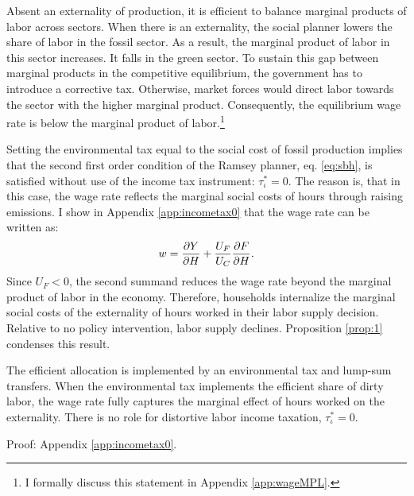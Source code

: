 Absent an externality of production, it is efficient to balance marginal products of labor across sectors.
When there is an externality, the social planner lowers the share of labor in the fossil sector. As a result, the marginal product of labor in this sector increases. It falls in the green sector. To sustain this gap between marginal products in the competitive equilibrium, the government has to introduce a corrective tax. Otherwise, market forces would direct labor towards the sector with the higher marginal product. Consequently, the equilibrium wage rate is below the marginal product of labor.\footnote{ I formally discuss this statement in Appendix \ref{app:wageMPL}.} 

Setting the environmental tax equal to the social cost of fossil production implies that the second first order condition of the Ramsey planner, eq. \eqref{eq:sbh}, is satisfied without use of the income tax instrument: $\tau_{\iota}^*=0$. 
The reason is, that in this case, the wage rate reflects the marginal social costs of hours through raising emissions. I show in Appendix \ref{app:incometax0} that the wage rate can be written as:
\begin{align*}
w = \frac{\partial{Y}}{\partial{H}}+\frac{U_F}{U_C}\frac{\partial{F}}{\partial{H}}.
\end{align*}
Since $U_F<0$, the second summand reduces the wage rate beyond the marginal product of labor in the economy.
Therefore, households internalize the marginal social costs of the externality of hours worked in their labor supply decision. Relative to no policy intervention, labor supply declines. Proposition \ref{prop:1} condenses this result.

\begin{prop}\label{prop:1}
	The efficient allocation is implemented by an environmental tax and lump-sum transfers.  When the environmental tax implements the efficient share of dirty labor, the wage rate fully captures the marginal effect of hours worked on the externality. There is no role for distortive labor income taxation, $\tau_{\iota}^*=0$.
\end{prop}
Proof: Appendix \ref{app:incometax0}. 



